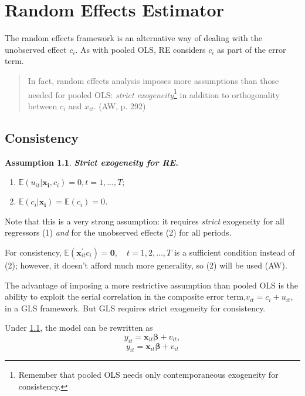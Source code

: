 \documentclass[11pt, a4paper]{report}
\theoremstyle{plain}
\newtheorem{assump}[thm]{Assumption}
\theoremstyle{plain}
\theoremstyle{remark}
\begin{document}
\chapter{Random Effects Estimator}

The random effects framework is an alternative way of dealing with the unobserved effect $c_i$. As with pooled OLS, RE considers $c_i$ as part of the error term. 
\begin{quote}
    In fact,
random effects analysis imposes more assumptions than those needed for pooled OLS: \textit{strict exogeneity}\footnote{Remember that pooled OLS needs only contemporaneous exogeneity for consistency.} in addition to orthogonality between $c_i$ and $x_{it}$. (AW, p. 292)
\end{quote}



\section{Consistency}

\begin{assump}
    \textbf{Strict exogeneity for RE.} \label{strict_exog_re}
    \begin{enumerate}
        \item $\mathbb{E}(u_{it} | \mathbf{x_i}, c_i) = 0, t = 1, ..., T;$
        \item $\mathbb{E}(c_i | \mathbf{x_i}) = \mathbb{E}(c_i) = 0$.
    \end{enumerate}
\end{assump}
Note that this is a very strong assumption: it requires \textit{strict} exogeneity for all regressors (1) \textit{and} for the unobserved effects (2) for all periods.

For consistency, $\mathbb{E}\left(\mathbf{x}_{i t}^{\prime} c_{i}\right)=\mathbf{0}, \quad t=1,2, \ldots, T$ is a sufficient condition instead of (2); however, it doesn't afford much more generality, so (2) will be used (AW). 

The advantage of imposing a more restrictive assumption than pooled OLS is the ability to exploit the serial correlation in the composite error term,$ v_{it} = c_i + u_{it}$, in a GLS framework. But GLS requires strict exogeneity for consistency.

Under \ref{strict_exog_re}, the model can be rewritten as
\begin{equation}
    y_{i t}=\mathbf{x}_{i t} \boldsymbol{\beta}+v_{i t},
\end{equation}
\begin{equation}
    y_{i t}=\mathbf{x}_{i t} \boldsymbol{\beta}+v_{i t}
\end{equation}
\end{document}
